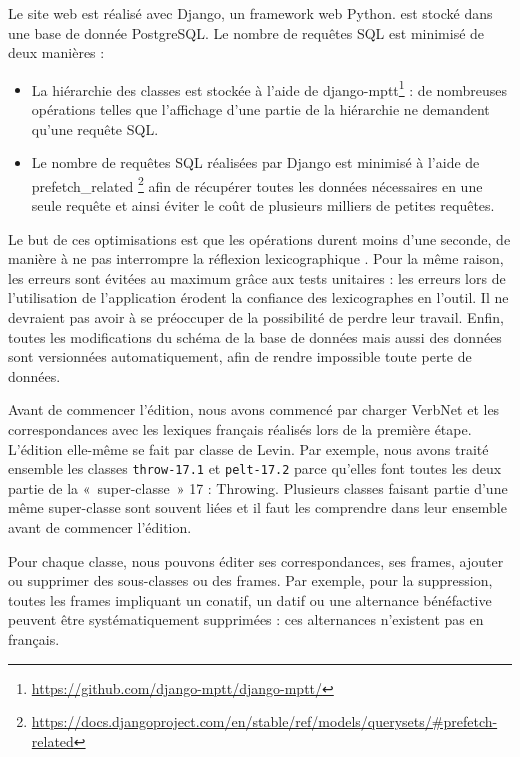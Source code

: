 Le site web est réalisé avec Django, un framework web Python. \verbenet{} est
stocké dans une base de donnée PostgreSQL. Le nombre de requêtes SQL est
minimisé de deux manières :
\begin{itemize}
    \item La hiérarchie des classes est stockée à l'aide de
        django-mptt\footnote{\url{https://github.com/django-mptt/django-mptt/}}
        : de nombreuses opérations telles que l'affichage d'une partie de la
        hiérarchie ne demandent qu'une requête SQL.
    \item Le nombre de requêtes SQL réalisées par Django est minimisé à l'aide
        de prefetch\_related
        \footnote{\url{https://docs.djangoproject.com/en/stable/ref/models/querysets/#prefetch-related}}
        afin de récupérer toutes les données nécessaires en une seule requête
        et ainsi éviter le coût de plusieurs milliers de petites requêtes.
\end{itemize}

Le but de ces optimisations est que les opérations durent moins d'une seconde,
de manière à ne pas interrompre la réflexion lexicographique
\citep{nielsen1994response}. Pour la même raison, les erreurs sont évitées au
maximum grâce aux tests unitaires : les erreurs lors de l'utilisation de
l'application érodent la confiance des lexicographes en l'outil. Il ne
devraient pas avoir à se préoccuper de la possibilité de perdre leur travail.
Enfin, toutes les modifications du schéma de la base de données mais aussi des
données sont versionnées automatiquement, afin de rendre impossible toute perte
de données.

Avant de commencer l'édition, nous avons commencé par charger VerbNet et les
correspondances avec les lexiques français réalisés lors de la première étape.
L'édition elle-même se fait par classe de Levin. Par exemple, nous avons traité
ensemble les classes {\color{blue}\texttt{throw-17.1}} et
{\color{blue}\texttt{pelt-17.2}} parce qu'elles font toutes les deux partie de
la «~super-classe~» 17 : Throwing.  Plusieurs classes faisant partie d'une même
super-classe sont souvent liées et il faut les comprendre dans leur ensemble
avant de commencer l'édition.

Pour chaque classe, nous pouvons éditer ses correspondances, ses frames,
ajouter ou supprimer des sous-classes ou des frames. Par exemple, pour la
suppression, toutes les frames impliquant un conatif, un datif ou une
alternance bénéfactive peuvent être systématiquement supprimées : ces
alternances n'existent pas en français.

